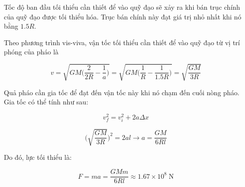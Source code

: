 \begin{solution}

Tốc độ ban đầu tối thiểu cần thiết để vào quỹ đạo sẽ xảy ra khi bán trục chính của quỹ đạo được tối thiểu hóa. Trục bán chính này đạt giá trị nhỏ nhất khi nó bằng $1.5R$.

Theo phương trình vis-viva, vận tốc tối thiểu cần thiết để vào quỹ đạo từ vị trí phóng của pháo là

$$v = \sqrt{GM\bigg(\frac{2}{2R}-\frac{1}{a}\bigg)} = \sqrt{GM\bigg(\frac{1}{R}-\frac{1}{1.5R}\bigg)} = \sqrt{\frac{GM}{3R}}$$

Quả pháo cần gia tốc để đạt đến vận tốc này khi nó chạm đến cuối nòng pháo. Gia tốc có thể tính như sau:

$$v_f^2 = v_i^2 + 2a\Delta x$$

$$\bigg(\sqrt{\frac{GM}{3R}}\bigg)^2 = 2al\longrightarrow a = \frac{GM}{6Rl}$$

Do đó, lực tối thiểu là:

$$ F = ma = \frac{GMm}{6Rl}\approx \boxed{1.67\times10^8\;\mathrm{N}}$$

\end{solution}